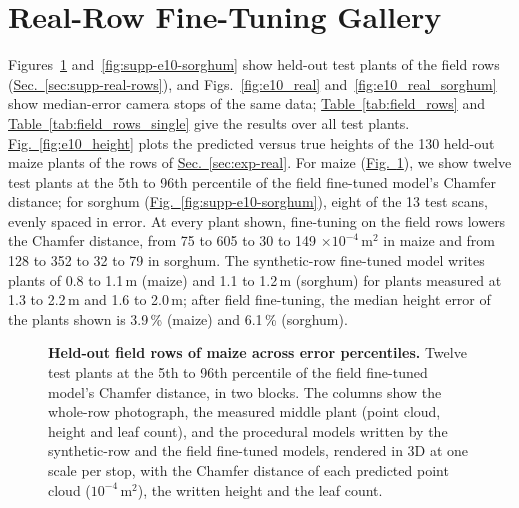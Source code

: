 \documentclass[10pt,twocolumn,letterpaper]{article}
\newcommand{\updtwo}[1]{#1}
\newcommand{\figref}[1]{\hyperref[#1]{Fig.~\ref*{#1}}}
\newcommand{\tabref}[1]{\hyperref[#1]{Table~\ref*{#1}}}
\newcommand{\secref}[1]{\hyperref[#1]{Sec.~\ref*{#1}}}
\begin{document}
\section{Real-Row Fine-Tuning Gallery}
\label{sec:supp-e10}

\updtwo{\textcolor{cvprblue}{Figures}~\ref{fig:supp-e10-maize} and~\ref{fig:supp-e10-sorghum} show held-out test plants of the field rows (\secref{sec:supp-real-rows}), and \textcolor{cvprblue}{Figs.}~\ref{fig:e10_real} and~\ref{fig:e10_real_sorghum} show median-error camera stops of the same data; \tabref{tab:field_rows} and \tabref{tab:field_rows_single} give the results over all test plants. \figref{fig:e10_height} plots the predicted versus true heights of the 130 held-out maize plants of the rows of \secref{sec:exp-real}. For maize (\figref{fig:supp-e10-maize}), we show twelve test plants at the 5th to 96th percentile of the field fine-tuned model's Chamfer distance; for sorghum (\figref{fig:supp-e10-sorghum}), eight of the 13 test scans, evenly spaced in error. At every plant shown, fine-tuning on the field rows lowers the Chamfer distance, from 75 to 605 to 30 to 149 $\times 10^{-4}$\,m$^2$ in maize and from 128 to 352 to 32 to 79 in sorghum. The synthetic-row fine-tuned model writes plants of 0.8 to 1.1\,m (maize) and 1.1 to 1.2\,m (sorghum) for plants measured at 1.3 to 2.2\,m and 1.6 to 2.0\,m; after field fine-tuning, the median height error of the plants shown is 3.9\,\% (maize) and 6.1\,\% (sorghum).}

\begin{figure}[t!]
  \centering
  \resizebox{\textwidth}{!}{}
  \caption{\updtwo{\textbf{Held-out field rows of maize across error percentiles.} Twelve test plants at the 5th to 96th percentile of the field fine-tuned model's Chamfer distance, in two blocks. The columns show the whole-row photograph, the measured middle plant (point cloud, height and leaf count), and the procedural models written by the synthetic-row and the field fine-tuned models, rendered in 3D at one scale per stop, with the Chamfer distance of each predicted point cloud ($10^{-4}$\,m$^2$), the written height and the leaf count.}}
  \label{fig:supp-e10-maize}
\end{figure}
\end{document}
